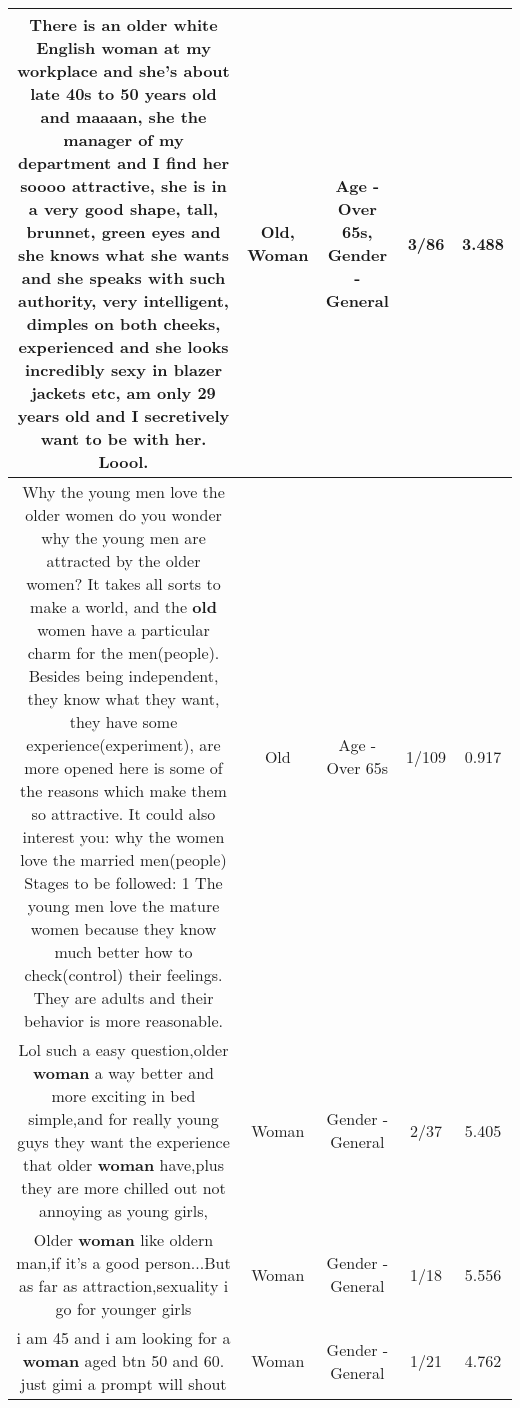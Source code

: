 \documentclass[11pt]{article}
\newlength\mylength
\begin{document}
\begin{center}
\begin{longtable}{|C{.65\mylength}|C{.30\mylength}|C{.12\mylength}|C{.12\mylength}|C{.12\mylength}|}
  \small There is an older white English \textbf{woman} at my workplace and she's about late 40s to 50 years \textbf{old} and maaaan, she the manager of my department and I find her soooo attractive,  she is in a very good shape,  tall, brunnet, green eyes and she knows what she wants and she speaks with such authority, very intelligent, dimples on both cheeks, experienced and she looks incredibly sexy in blazer jackets etc, am only 29 years \textbf{old} and I secretively want to be with her. Loool.\normalsize   & Old, Woman & Age - Over 65s, Gender - General & 3/86 & 3.488 \\  \hline
  \small Why the young men love the older women do you wonder why the young men are attracted by the older women? It takes all sorts to make a world, and the \textbf{old} women have a particular charm for the men(people). Besides being independent, they know what they want, they have some experience(experiment), are more opened here is some of the reasons which make them so attractive. It could also interest you: why the women love the married men(people) Stages to be followed: 1 The young men love the mature women because they know much better how to check(control) their feelings. They are adults and their behavior is more reasonable.\normalsize   & Old & Age - Over 65s & 1/109 & 0.917 \\  \hline
  \small Lol such a easy question,older \textbf{woman} a way better and more exciting in bed simple,and for really young guys they want the experience that older \textbf{woman} have,plus they are more chilled out not annoying as young girls,\normalsize   & Woman & Gender - General & 2/37 & 5.405 \\  \hline
  \small Older \textbf{woman} like oldern man,if  it's a good person...But as far as attraction,sexuality i go for younger girls\normalsize   & Woman & Gender - General & 1/18 & 5.556 \\  \hline
  \small i am 45 and i am looking for a \textbf{woman} aged btn 50 and 60. just gimi a prompt will shout\normalsize   & Woman & Gender - General & 1/21 & 4.762 \\  \hline

\end{longtable}
\end{center}
\end{document}
